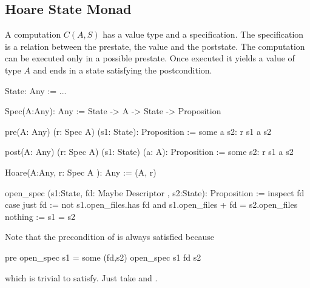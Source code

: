 \subsection{Hoare State Monad}

A computation $C(A,S)$ has a value type and a specification. The specification
is a relation between the prestate, the value and the poststate. The
computation can be executed only in a possible prestate. Once executed it
yields a value of type $A$ and ends in a state satisfying the postcondition.

\begin{alba}
  State: Any := ...

  Spec(A:Any): Any :=
    State -> A -> State -> Proposition

  pre(A: Any) (r: Spec A)  (s1: State): Proposition :=
    some a s2: r s1 a s2

  post(A: Any) (r: Spec A) (s1: State) (a: A): Proposition :=
    some s2: r s1 a s2


  Hoare(A:Any, r: Spec A ): Any := (A, r)

  open_spec (s1:State, fd: Maybe Descriptor , s2:State): Proposition :=
    inspect fd case
      just fd  :=
        not s1.open_files.has fd
        and
        s1.open_files + fd = s2.open_files
      nothing :=
        s1 = s2
\end{alba}
Note that the precondition of  is always satisfied because
%
\begin{alba}
   pre open_spec s1  = some (fd,s2) open_spec s1 fd s2
\end{alba}
%
which is trivial to satisfy. Just take  and .

